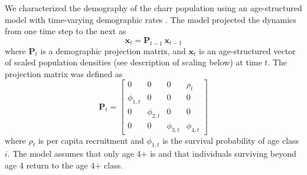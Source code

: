 We characterized the demography of the charr population 
using an age-structured model \citep{caswell2001matrix}
with time-varying demographic rates \citep{zeng1998, nielsen2014estimation}.
The model projected the dynamics from one time step to the next as
%
\begin{equation} \label{eq:XPX}
    \mathbf{x}_t = \mathbf{P}_{t-1}~\mathbf{x}_{t-1}
\end{equation}
%
where $\mathbf{P}_{t}$ is a demographic projection matrix,
and $\mathbf{x}_t$ is an age-structured vector of scaled population densities 
(see description of scaling below) at time $t$.
%
The projection matrix was defined as
%
\begin{equation} \label{eq:matrix}
\mathbf{P}_{t} = 
\left[
\begin{array}{cccccccc}
    0             & 0             & 0             & \rho_{t}     \\
    \phi_{1,t}    & 0             & 0             & 0            \\
    0             & \phi_{2,t}    & 0             & 0            \\
    0             & 0             & \phi_{3,t}    & \phi_{4,t}
    \end{array}
\right]
\end{equation}
%
where $\rho_{t}$ is per capita recruitment 
and $\phi_{1,t}$ is the survival probability of age class $i$. 
The model assumes that only age 4+ is
and that individuals surviving beyond age 4 return to the age 4+ class.

